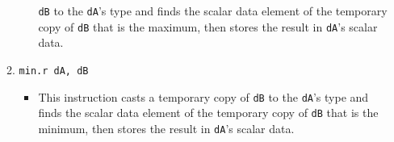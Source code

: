\documentclass{article}
\begin{document}
\begin{itemize}
\begin{enumerate}
\begin{itemize}
					\texttt{dB} to the \texttt{dA}'s type and finds the
					scalar data element of the temporary copy of
					\texttt{dB} that is the maximum, then stores the result
					in \texttt{dA}'s scalar data.
				\end{itemize}
			\item \texttt{min.r dA, dB}
				\begin{itemize}
				\item This instruction casts a temporary copy of
					\texttt{dB} to the \texttt{dA}'s type and finds the
					scalar data element of the temporary copy of
					\texttt{dB} that is the minimum, then stores the result
					in \texttt{dA}'s scalar data.
				\end{itemize}


\end{enumerate}
\end{itemize}
\end{document}
